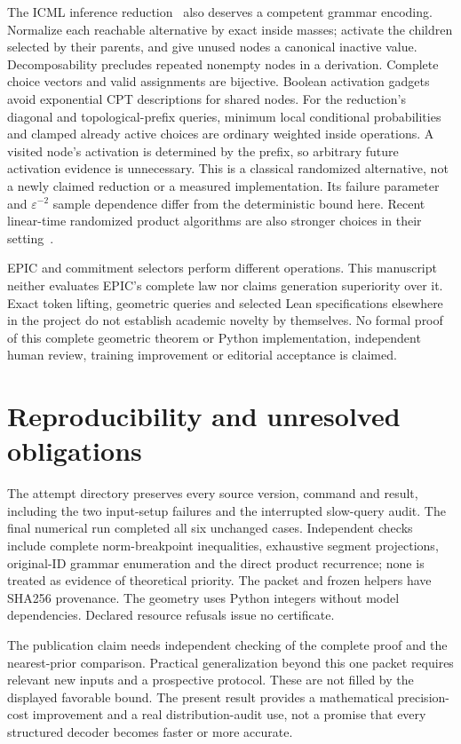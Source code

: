\documentclass[11pt]{article}
\begin{document}
The ICML inference reduction~\cite{inference} also deserves a competent grammar
encoding. Normalize each reachable alternative by exact inside masses; activate
the children selected by their parents, and give unused nodes a canonical
inactive value. Decomposability precludes repeated nonempty nodes in a
derivation. Complete choice vectors and valid assignments are bijective.
Boolean activation gadgets avoid exponential CPT descriptions for shared nodes.
For the reduction's diagonal and topological-prefix queries, minimum local
conditional probabilities and clamped already active choices are ordinary
weighted inside operations. A visited node's activation is determined by
the prefix, so arbitrary future activation evidence is unnecessary.
This is a classical randomized alternative, not a newly claimed reduction
or a measured implementation. Its failure parameter and $\varepsilon^{-2}$
sample dependence differ from the deterministic bound here. Recent linear-time
randomized product algorithms are also stronger choices in their setting~\cite{linear}.

EPIC and commitment selectors perform different operations. This manuscript
neither evaluates EPIC's complete law nor claims generation superiority over
it. Exact token lifting, geometric queries and selected Lean specifications
elsewhere in the project do not establish academic novelty by themselves.
No formal proof of this complete geometric theorem or Python implementation,
independent human review, training improvement or editorial acceptance is
claimed.

\section{Reproducibility and unresolved obligations}
The attempt directory preserves every source version, command and result,
including the two input-setup failures and the interrupted slow-query audit.
The final numerical run completed all six unchanged cases. Independent checks
include complete norm-breakpoint inequalities, exhaustive segment projections,
original-ID grammar enumeration and the direct product recurrence; none is
treated as evidence of theoretical priority. The packet and frozen helpers
have SHA256 provenance. The geometry uses Python integers without model
dependencies. Declared resource refusals issue no certificate.

The publication claim needs independent checking of the complete proof and
the nearest-prior comparison. Practical generalization beyond this one packet
requires relevant new inputs and a prospective protocol. These are not filled
by the displayed favorable bound. The present result provides a mathematical
precision-cost improvement and a real distribution-audit use, not a promise
that every structured decoder becomes faster or more accurate.
\end{document}

